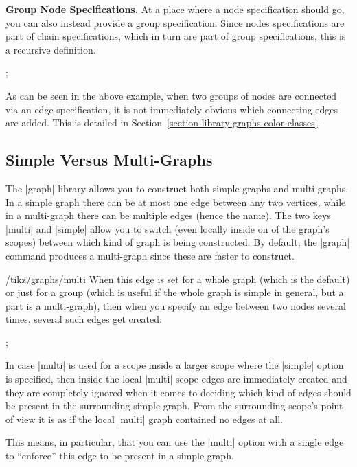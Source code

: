 \medskip
\textbf{Group Node Specifications.}
At a place where a node specification should go, you can also instead
provide a group specification. Since nodes specifications are part of
chain specifications, which in turn are part of group specifications,
this is a recursive definition.

\begin{codeexample}[]
\tikz {};
\end{codeexample}

As can be seen in the above example, when two groups of nodes are
connected via an edge specification, it is not immediately obvious
which connecting edges are added. This is detailed in
Section~\ref{section-library-graphs-color-classes}. 

\subsection{Simple Versus Multi-Graphs}

\label{section-library-graphs-simple}

The |graph| library allows you to construct both simple graphs and
multi-graphs. In a simple graph there can be at most one edge between
any two vertices, while in a multi-graph there can be multiple edges
(hence the name). The two keys |multi| and |simple| allow you to
switch (even locally inside on of the graph's scopes) between which
kind of graph is being constructed. By default, the |graph| command
produces a multi-graph since these are faster to construct.

\begin{key}{/tikz/graphs/multi}
  When this edge is set for a whole graph (which is the default) or
  just for a group (which is useful if the whole graph is simple in
  general, but a part is a multi-graph), then when you specify an edge
  between two nodes several times, several such edges get created:

\begin{codeexample}[]
\tikz {};
\end{codeexample}
  In case |multi| is used for a scope inside a larger scope where the
  |simple| option is specified, then inside the local |multi| scope
  edges are immediately created and they are completely ignored when
  it comes to deciding which kind of edges should be present in the
  surrounding simple graph. From the surrounding scope's point of view
  it is as if the local |multi| graph contained no edges at all.

  This means, in particular, that you can use the |multi| option with
  a single edge to ``enforce'' this edge to be present in a simple
  graph. 
\end{key}

